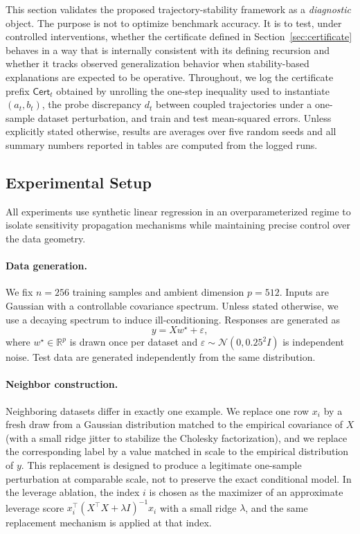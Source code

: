 \documentclass{article}
\numberwithin{equation}{section}
\begin{document}
This section validates the proposed trajectory-stability framework as a \emph{diagnostic} object. The purpose is not to optimize benchmark accuracy. It is to test, under controlled interventions, whether the certificate defined in Section~\ref{sec:certificate} behaves in a way that is internally consistent with its defining recursion and whether it tracks observed generalization behavior when stability-based explanations are expected to be operative. Throughout, we log the certificate prefix $\mathsf{Cert}_t$ obtained by unrolling the one-step inequality used to instantiate $(a_t,b_t)$, the probe discrepancy $d_t$ between coupled trajectories under a one-sample dataset perturbation, and train and test mean-squared errors. Unless explicitly stated otherwise, results are averages over five random seeds and all summary numbers reported in tables are computed from the logged runs.

\subsection{Experimental Setup}
\label{subsec:experimental_setup}

All experiments use synthetic linear regression in an overparameterized regime to isolate sensitivity propagation mechanisms while maintaining precise control over the data geometry.

\paragraph{Data generation.}
We fix $n=256$ training samples and ambient dimension $p=512$. Inputs are Gaussian with a controllable covariance spectrum. Unless stated otherwise, we use a decaying spectrum to induce ill-conditioning. Responses are generated as
\[
y = X w^\star + \varepsilon,
\]
where $w^\star \in \mathbb{R}^p$ is drawn once per dataset and $\varepsilon \sim \mathcal{N}(0,0.25^2 I)$ is independent noise. Test data are generated independently from the same distribution.

\paragraph{Neighbor construction.}
Neighboring datasets differ in exactly one example. We replace one row $x_i$ by a fresh draw from a Gaussian distribution matched to the empirical covariance of $X$ (with a small ridge jitter to stabilize the Cholesky factorization), and we replace the corresponding label by a value matched in scale to the empirical distribution of $y$. This replacement is designed to produce a legitimate one-sample perturbation at comparable scale, not to preserve the exact conditional model. In the leverage ablation, the index $i$ is chosen as the maximizer of an approximate leverage score $x_i^\top (X^\top X + \lambda I)^{-1} x_i$ with a small ridge $\lambda$, and the same replacement mechanism is applied at that index.
\end{document}
